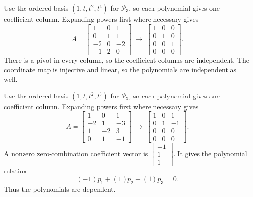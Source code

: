 Use the ordered basis $(1,t,t^2,t^3)$ for $\mathcal P_3$, so each polynomial gives one coefficient column. Expanding powers first where necessary gives
\[A=\left[\begin{array}{rrr}1&0&1\\0&1&1\\-2&0&-2\\-1&2&0\end{array}\right]\ \longrightarrow\ \left[\begin{array}{rrr}1&0&0\\0&1&0\\0&0&1\\0&0&0\end{array}\right].\]
There is a pivot in every column, so the coefficient columns are independent. The coordinate map is injective and linear, so the polynomials are independent as well.

Use the ordered basis $(1,t,t^2,t^3)$ for $\mathcal P_3$, so each polynomial gives one coefficient column. Expanding powers first where necessary gives
\[A=\left[\begin{array}{rrr}1&0&1\\-2&1&-3\\1&-2&3\\0&1&-1\end{array}\right]\ \longrightarrow\ \left[\begin{array}{rrr}1&0&1\\0&1&-1\\0&0&0\\0&0&0\end{array}\right].\]
A nonzero zero-combination coefficient vector is $\left[\begin{array}{r}-1\\1\\1\end{array}\right]$. It gives the polynomial relation
\[(-1)p_{1}+(1)p_{2}+(1)p_{3}=0.\]
Thus the polynomials are dependent.

